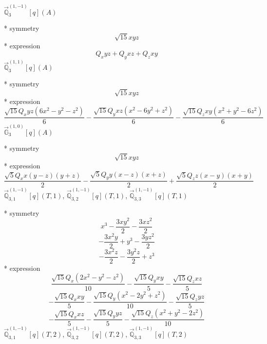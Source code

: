 \documentclass[fleqn,8pt]{jsarticle}
\begin{document}
\noindent\quad $\vec{\mathbb{Q}}_{3}^{(1,-1)}[q](A)$

\noindent\quad ** symmetry
\begin{dmath*}
\sqrt{15} x y z
\end{dmath*}
\noindent\quad ** expression
\begin{dmath*}
Q_{x} y z + Q_{y} x z + Q_{z} x y
\end{dmath*}
\noindent\quad $\vec{\mathbb{Q}}_{3}^{(1,1)}[q](A)$

\noindent\quad ** symmetry
\begin{dmath*}
\sqrt{15} x y z
\end{dmath*}
\noindent\quad ** expression
\begin{dmath*}
\frac{\sqrt{15} Q_{x} y z \left(6 x^{2} - y^{2} - z^{2}\right)}{6} - \frac{\sqrt{15} Q_{y} x z \left(x^{2} - 6 y^{2} + z^{2}\right)}{6} - \frac{\sqrt{15} Q_{z} x y \left(x^{2} + y^{2} - 6 z^{2}\right)}{6}
\end{dmath*}
\noindent\quad $\vec{\mathbb{G}}_{3}^{(1,0)}[q](A)$

\noindent\quad ** symmetry
\begin{dmath*}
\sqrt{15} x y z
\end{dmath*}
\noindent\quad ** expression
\begin{dmath*}
\frac{\sqrt{5} Q_{x} x \left(y - z\right) \left(y + z\right)}{2} - \frac{\sqrt{5} Q_{y} y \left(x - z\right) \left(x + z\right)}{2} + \frac{\sqrt{5} Q_{z} z \left(x - y\right) \left(x + y\right)}{2}
\end{dmath*}
\noindent\quad $\vec{\mathbb{Q}}_{3,1}^{(1,-1)}[q](T,1)$, $\vec{\mathbb{Q}}_{3,2}^{(1,-1)}[q](T,1)$, $\vec{\mathbb{Q}}_{3,3}^{(1,-1)}[q](T,1)$

\noindent\quad ** symmetry
\begin{dmath*}
x^{3} - \frac{3 x y^{2}}{2} - \frac{3 x z^{2}}{2}
\end{dmath*}
\begin{dmath*}
- \frac{3 x^{2} y}{2} + y^{3} - \frac{3 y z^{2}}{2}
\end{dmath*}
\begin{dmath*}
- \frac{3 x^{2} z}{2} - \frac{3 y^{2} z}{2} + z^{3}
\end{dmath*}
\noindent\quad ** expression
\begin{dmath*}
\frac{\sqrt{15} Q_{x} \left(2 x^{2} - y^{2} - z^{2}\right)}{10} - \frac{\sqrt{15} Q_{y} x y}{5} - \frac{\sqrt{15} Q_{z} x z}{5}
\end{dmath*}
\begin{dmath*}
- \frac{\sqrt{15} Q_{x} x y}{5} - \frac{\sqrt{15} Q_{y} \left(x^{2} - 2 y^{2} + z^{2}\right)}{10} - \frac{\sqrt{15} Q_{z} y z}{5}
\end{dmath*}
\begin{dmath*}
- \frac{\sqrt{15} Q_{x} x z}{5} - \frac{\sqrt{15} Q_{y} y z}{5} - \frac{\sqrt{15} Q_{z} \left(x^{2} + y^{2} - 2 z^{2}\right)}{10}
\end{dmath*}
\noindent\quad $\vec{\mathbb{Q}}_{3,1}^{(1,-1)}[q](T,2)$, $\vec{\mathbb{Q}}_{3,2}^{(1,-1)}[q](T,2)$, $\vec{\mathbb{Q}}_{3,3}^{(1,-1)}[q](T,2)$
\end{document}
